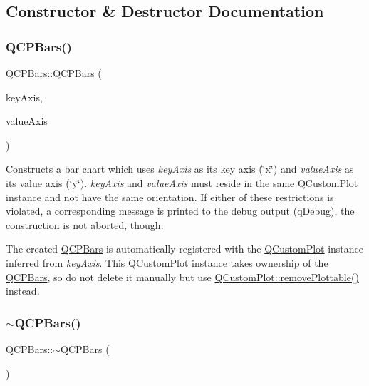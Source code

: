 \subsection{Constructor \& Destructor Documentation}
\mbox{\label{class_q_c_p_bars_a64006999ad9dff308f40df41cef176ad}} 
\subsubsection{\texorpdfstring{Q\+C\+P\+Bars()}{QCPBars()}}
{\footnotesize\ttfamily Q\+C\+P\+Bars\+::\+Q\+C\+P\+Bars (\begin{DoxyParamCaption}\item[{\hyperlink{class_q_c_p_axis}{Q\+C\+P\+Axis} $\ast$}]{key\+Axis,  }\item[{\hyperlink{class_q_c_p_axis}{Q\+C\+P\+Axis} $\ast$}]{value\+Axis }\end{DoxyParamCaption})\hspace{0.3cm}{\ttfamily [explicit]}}

Constructs a bar chart which uses {\itshape key\+Axis} as its key axis (\char`\"{}x\char`\"{}) and {\itshape value\+Axis} as its value axis (\char`\"{}y\char`\"{}). {\itshape key\+Axis} and {\itshape value\+Axis} must reside in the same \hyperlink{class_q_custom_plot}{Q\+Custom\+Plot} instance and not have the same orientation. If either of these restrictions is violated, a corresponding message is printed to the debug output (q\+Debug), the construction is not aborted, though.

The created \hyperlink{class_q_c_p_bars}{Q\+C\+P\+Bars} is automatically registered with the \hyperlink{class_q_custom_plot}{Q\+Custom\+Plot} instance inferred from {\itshape key\+Axis}. This \hyperlink{class_q_custom_plot}{Q\+Custom\+Plot} instance takes ownership of the \hyperlink{class_q_c_p_bars}{Q\+C\+P\+Bars}, so do not delete it manually but use \hyperlink{class_q_custom_plot_af3dafd56884208474f311d6226513ab2}{Q\+Custom\+Plot\+::remove\+Plottable()} instead. \mbox{\label{class_q_c_p_bars_a4d880e28031ef120603f543379be2f22}} 
\subsubsection{\texorpdfstring{$\sim$\+Q\+C\+P\+Bars()}{~QCPBars()}}
{\footnotesize\ttfamily Q\+C\+P\+Bars\+::$\sim$\+Q\+C\+P\+Bars (\begin{DoxyParamCaption}{ }\end{DoxyParamCaption})\hspace{0.3cm}{\ttfamily [virtual]}}



